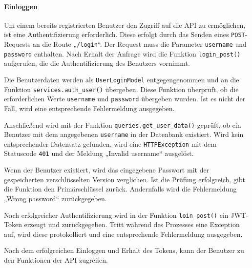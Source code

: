 \documentclass[12pt, letterpaper]{article}
\begin{document}
  \paragraph{Einloggen}
  \par \textbf{}
  \par Um einem bereits registrierten Benutzer den Zugriff auf die API zu ermöglichen, ist eine Authentifizierung erforderlich. Diese erfolgt durch das Senden eines \texttt{POST}-Requests an die Route „\texttt{/login}“. Der Request muss die Parameter \texttt{username} und \texttt{password} enthalten. Nach Erhalt der Anfrage wird die Funktion \texttt{login\_post()} aufgerufen, die die Authentifizierung des Benutzers vornimmt.
  \par Die Benutzerdaten werden als \texttt{UserLoginModel} entgegengenommen und an die Funktion \texttt{services.auth\_user()} übergeben. Diese Funktion überprüft, ob die erforderlichen Werte \texttt{username} und \texttt{password} übergeben wurden. Ist es nicht der Fall, wird eine entsprechende Fehlermeldung ausgegeben. 
  \par Anschließend wird mit der Funktion \texttt{queries.get\_user\_data()} geprüft, ob ein Benutzer mit dem angegebenen \texttt{username} in der Datenbank existiert. Wird kein entsprechender Datensatz gefunden, wird eine \texttt{HTTPException} mit dem Statuscode \texttt{401} und der Meldung „Invalid username“ ausgelöst.
  \par Wenn der Benutzer existiert, wird das eingegebene Passwort mit der gespeicherten verschlüsselten Version verglichen. Ist die Prüfung erfolgreich, gibt die Funktion den Primärschlüssel zurück. Andernfalls wird die Fehlermeldung „Wrong password“ zurückgegeben.
  \par Nach erfolgreicher Authentifizierung wird in der Funktion \texttt{loin\_post()} ein JWT-Token erzeugt und zurückgegeben. Tritt während des Prozesses eine Exception auf, wird diese protokolliert und eine entsprechende Fehlermeldung ausgegeben.
  \par Nach dem erfolgreichen Einloggen und Erhalt des Tokens, kann der Benutzer zu den Funktionen der API zugreifen. 
\end{document}
